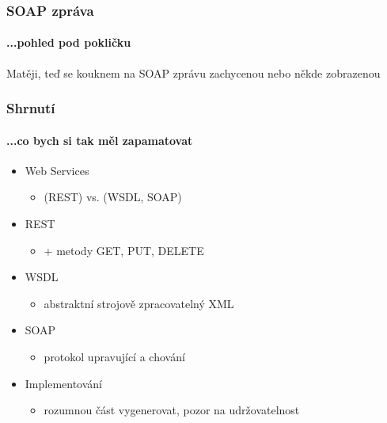 \documentclass[12pt]{beamer}
\begin{document}
\begin{frame}
  \frametitle{SOAP zpráva}
  \framesubtitle{...pohled pod pokličku}

  \begin{example}
    Matěji, teď se kouknem na SOAP zprávu zachycenou nebo někde zobrazenou
  \end{example}
\end{frame}

\begin{frame}
  \frametitle{Shrnutí}
  \framesubtitle{...co bych si tak měl zapamatovat}

  \begin{itemize}
    \item Web Services
    \begin{itemize}
      \item {} (REST) vs.  (WSDL, SOAP)
    \end{itemize}

    \item REST
    \begin{itemize}
      \item {} + metody GET, PUT, DELETE
    \end{itemize}

    \item WSDL
    \begin{itemize}
      \item abstraktní strojově zpracovatelný XML 
    \end{itemize}

    \item SOAP
    \begin{itemize}
      \item protokol upravující  a chování 
    \end{itemize}

    \item Implementování
    \begin{itemize}
      \item rozumnou část vygenerovat, \alert{pozor na udržovatelnost}
    \end{itemize}
  \end{itemize}
\end{frame}
\end{document}
